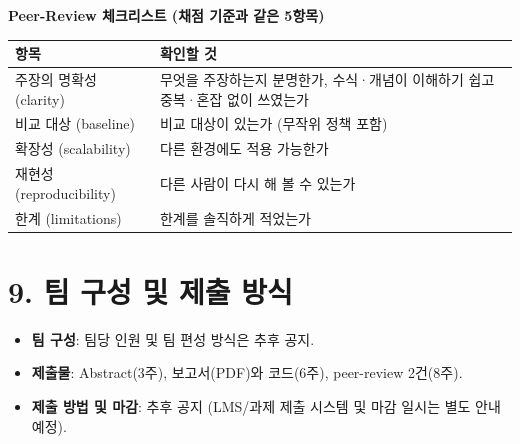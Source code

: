 \documentclass[12pt]{article}
\begin{document}
\vspace{4pt}
\noindent\textbf{Peer-Review 체크리스트 (채점 기준과 같은 5항목)}
\begin{center}
\small
\begin{tabular}{@{}ll@{}}
\toprule
항목 & 확인할 것 \\
\midrule
주장의 명확성 (clarity) & 무엇을 주장하는지 분명한가, 수식·개념이 이해하기 쉽고 중복·혼잡 없이 쓰였는가 \\
비교 대상 (baseline) & 비교 대상이 있는가 (무작위 정책 포함) \\
확장성 (scalability) & 다른 환경에도 적용 가능한가 \\
재현성 (reproducibility) & 다른 사람이 다시 해 볼 수 있는가 \\
한계 (limitations) & 한계를 솔직하게 적었는가 \\
\bottomrule
\end{tabular}
\end{center}

\section*{9. 팀 구성 및 제출 방식}
\begin{itemize}
\item \textbf{팀 구성}: 팀당 인원 및 팀 편성 방식은 추후 공지.
\item \textbf{제출물}: Abstract(3주), 보고서(PDF)와 코드(6주), peer-review 2건(8주).
\item \textbf{제출 방법 및 마감}: 추후 공지 (LMS/과제 제출 시스템
  및 마감 일시는 별도 안내 예정).
\end{itemize}
\end{document}
